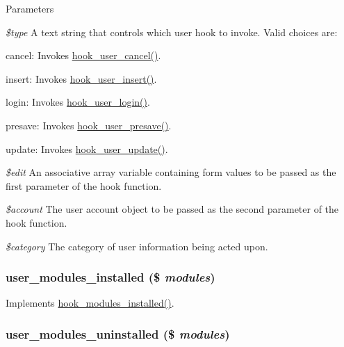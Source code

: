 \begin{DoxyParams}{Parameters}
\item[{\em \$type}]A text string that controls which user hook to invoke. Valid choices are:
\begin{DoxyItemize}
\item cancel: Invokes \hyperlink{group__hooks_gad6223ddd2f0f52c331df8a3315d9a41e}{hook\_\-user\_\-cancel()}.
\item insert: Invokes \hyperlink{group__hooks_gaa3e2c4c972ee796d216b15da7aaf9c2c}{hook\_\-user\_\-insert()}.
\item login: Invokes \hyperlink{group__hooks_ga8cce712a39ee6e57bd506b5a0c457d09}{hook\_\-user\_\-login()}.
\item presave: Invokes \hyperlink{group__hooks_gab6b224c35d7d97259d4350a7849f1e56}{hook\_\-user\_\-presave()}.
\item update: Invokes \hyperlink{group__hooks_gab71262402336071ef7c3d08f4c36e887}{hook\_\-user\_\-update()}. 
\end{DoxyItemize}\item[{\em \$edit}]An associative array variable containing form values to be passed as the first parameter of the hook function. \item[{\em \$account}]The user account object to be passed as the second parameter of the hook function. \item[{\em \$category}]The category of user information being acted upon. \end{DoxyParams}
\hypertarget{user_8module_ab57c127a7196e57c6858e8ebac02e8f2}{
\subsubsection[{user\_\-modules\_\-installed}]{\setlength{\rightskip}{0pt plus 5cm}user\_\-modules\_\-installed (\$ {\em modules})}}
\label{user_8module_ab57c127a7196e57c6858e8ebac02e8f2}
Implements \hyperlink{group__hooks_ga71b7268520567cac1a2f296c205e5227}{hook\_\-modules\_\-installed()}. \hypertarget{user_8module_a2eeb0c76aaabb3e178ab069c4f88fc1f}{
\subsubsection[{user\_\-modules\_\-uninstalled}]{\setlength{\rightskip}{0pt plus 5cm}user\_\-modules\_\-uninstalled (\$ {\em modules})}}

